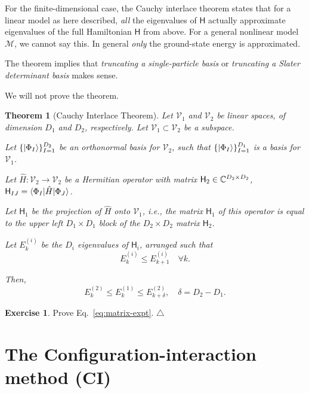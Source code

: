 \documentclass{report}
\theoremstyle{plain}
\newtheorem{theorem}{Theorem}[chapter]
\theoremstyle{definition}
\newtheorem{exerc}{Exercise}[chapter]
\newcommand\xqed[1]{%
  \leavevmode\unskip\penalty9999 \hbox{}\nobreak\hfill
  \quad\hbox{#1}}
\newcommand\demo{\xqed{$\triangle$}}
\newenvironment{exercise}{\bigskip\begin{exerc}}{\demo\end{exerc}\bigskip}
\begin{document}
For the finite-dimensional case, the Cauchy interlace theorem states
that for a linear model as here described, \emph{all} the eigenvalues
of $\mathsf{H}$ actually approximate eigenvalues of the full
Hamiltonian $\mathsf{H}$ from above. For a general nonlinear model
$\mathcal{M}$, we cannot say this. In general \emph{only} the
ground-state energy is approximated.


The theorem implies that \emph{truncating a
  single-particle basis} or \emph{truncating a Slater determinant
  basis} makes sense.

We will not prove the theorem.

\begin{theorem}[Cauchy Interlace Theorem]
  Let $\mathcal{V}_1$ and $\mathcal{V}_2$ be linear spaces, of
  dimension $D_1$ and $D_2$, respectively. Let $\mathcal{V}_1
  \subset \mathcal{V}_2$ be a subspace.

  Let $\{\ket{\Phi_I}\}_{I=1}^{D_2}$ be an
  orthonormal basis for $\mathcal{V}_2$, such that
  $\{\ket{\Phi_I}\}_{I=1}^{D_1}$ is a basis for $\mathcal{V}_1$.
  
  Let $\hat{H} : \mathcal{V}_2 \to \mathcal{V}_2$ be a Hermitian
  operator with matrix $\mathsf{H}_2 \in \mathbb{C}^{D_2\times D_2}$,
  $\mathsf{H}_{IJ} = \braket{\Phi_I|\hat{H}|\Phi_J}$.

  Let $\mathsf{H}_1$ be the projection of $\hat{H}$ onto
  $\mathcal{V}_1$, i.e., the matrix $\mathsf{H}_1$ of this operator is
  equal to the upper left $D_1\times D_1$ block of the $D_2\times D_2$ matrix $\mathsf{H}_2$.
  
  Let $E^{(i)}_k$ be the $D_i$ eigenvalues of $\mathsf{H}_i$,
  arranged such that
  \begin{equation}
    E^{(i)}_{k} \leq E^{(i)}_{k+1} \quad \forall k.
  \end{equation}

  Then,
  \begin{equation}
    E_k^{(2)} \leq E_k^{(1)} \leq E_{k+\delta}^{(2)}, \quad \delta =
    D_2 - D_1.
  \end{equation}
\end{theorem}


\begin{exercise}
  Prove Eq.~\eqref{eq:matrix-expt}.
\end{exercise}



\section{The Configuration-interaction method (CI)}
\label{se:ci}
\end{document}
